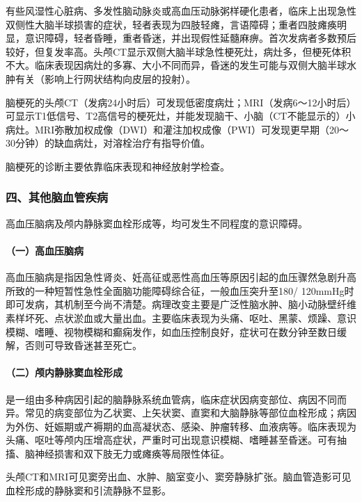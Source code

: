 有些风湿性心脏病、多发性脑动脉炎或高血压动脉粥样硬化患者，临床上出现急性双侧性大脑半球损害的症状，轻者表现为四肢轻瘫，言语障碍；重者四肢瘫痪明显，意识障碍，轻者昏睡，重者昏迷，并出现假性延髓麻痹。首次发病者多数预后较好，但复发率高。头颅CT显示双侧大脑半球急性梗死灶，病灶多，但梗死体积不大。临床表现因病灶的多寡、大小不同而异，昏迷的发生可能与双侧大脑半球水肿有关（影响上行网状结构向皮层的投射）。

脑梗死的头颅CT（发病24小时后）可发现低密度病灶；MRI（发病6～12小时后）可显示T1低信号、T2高信号的梗死灶，并能发现脑干、小脑（CT不能显示的）小病灶。MRI弥散加权成像（DWI）和灌注加权成像（PWI）可发现更早期（20～30分钟）的缺血病灶，对溶栓治疗有指导价值。

脑梗死的诊断主要依靠临床表现和神经放射学检查。

\subsubsection{四、其他脑血管疾病}

高血压脑病及颅内静脉窦血栓形成等，均可发生不同程度的意识障碍。

\paragraph{（一）高血压脑病}

高血压脑病是指因急性肾炎、妊高征或恶性高血压等原因引起的血压骤然急剧升高所致的一种短暂性急性全面脑功能障碍综合征，一般血压突升至180/
120mmHg时即可发病，其机制至今尚不清楚。病理改变主要是广泛性脑水肿、脑小动脉壁纤维素样坏死、点状淤血或大量出血。主要临床表现为头痛、呕吐、黑蒙、烦躁、意识模糊、嗜睡、视物模糊和癫痫发作，如血压控制良好，症状可在数分钟至数日缓解，否则可导致昏迷甚至死亡。

\paragraph{（二）颅内静脉窦血栓形成}

是一组由多种病因引起的脑静脉系统血管病，临床症状因病变部位、病因不同而异。常见的病变部位为乙状窦、上矢状窦、直窦和大脑静脉等部位血栓形成；病因为外伤、妊娠期或产褥期的血高凝状态、感染、肿瘤转移、血液病等。临床表现为头痛、呕吐等颅内压增高症状，严重时可出现意识模糊、嗜睡甚至昏迷。可有抽搐、脑神经损害和双下肢无力或瘫痪等局限性体征。

头颅CT和MRI可见窦旁出血、水肿、脑室变小、窦旁静脉扩张。脑血管造影可见血栓形成的静脉窦和引流静脉不显影。

\protect\hypertarget{text00377.html}{}{}

